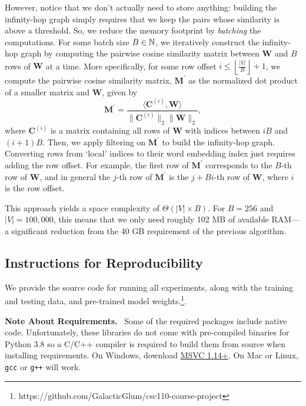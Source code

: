 \documentclass{paper}
\newcommand{\mat}[1]{\bm{#1}}
\newcommand{\inlineSection}[1]{\vspace{0.5em}\noindent\textbf{#1.}~}
\begin{document}
However, notice that we don't actually need to store anything: building the infinity-hop graph simply requires that we keep the pairs whose similarity is above a threshold. So, we reduce the memory footprint by \textit{batching} the computations. For some batch size $B\in\mathbb{N}$, we iteratively construct the infinity-hop graph by computing the pairwise cosine similarity matrix between $\mat{W}$ and $B$ rows of $\mat{W}$ at a time. More specifically, for some row offset $i\leq \left\lfloor\frac{|V|}{B}\right\rfloor + 1$, we compute the pairwise cosine similarity matrix, $\mat{M}^\prime$ as the normalized dot product of a smaller matrix and $\mat{W}$, given by
\begin{equation*}
    \mat{M}^\prime=\frac{\langle\mat{C}^{(i)}, \mat{W}\rangle}{\|\mat{C}^{(i)}\|_2\|\mat{W}\|_2},
\end{equation*}
where $\mat{C}^{(i)}$ is a matrix containing all rows of $\mat{W}$ with indices between $iB$ and $(i+1)B$. Then, we apply filtering on $\mat{M}^\prime$ to build the infinity-hop graph. Converting rows from `local' indices to their word embedding index just requires adding the row offset. For example, the first row of $\mat{M}^\prime$ corresponds to the $B$-th row of $\mat{W}$, and in general the $j$-th row of $\mat{M}^\prime$ is the $j+Bi$-th row of $\mat{W}$, where $i$ is the row offset.

This approach yields a space complexity of $\Theta(|V|\times B)$. For $B=256$ and $|V|=100,000$, this means that we only need roughly 102 MB of available RAM---a significant reduction from the 40 GB requirement of the previous algorithm.

\subsection{Instructions for Reproducibility}
We provide the source code for running all experiments, along with the training and testing data, and pre-trained model weights.\footnote{https://github.com/GalacticGlum/csc110-course-project}.

\inlineSection{Note About Requirements} Some of the required packages include native code. Unfortunately, these libraries do not come with pre-compiled binaries for Python 3.8 so a C/C++ compiler is required to build them from source when installing requirements. On Windows, download \textcolor{blue}{\hyperlink{https://visualstudio.microsoft.com/downloads/\#build-tools-for-visual-studio-2019}{MSVC 1.14+}}. On Mac or Linux, \texttt{gcc} or \texttt{g++} will work.
\end{document}
